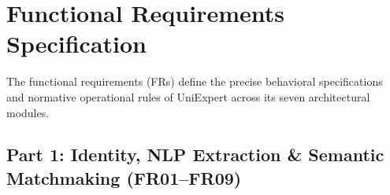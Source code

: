 \documentclass[10.5pt,a4paper]{article}
\begin{document}
\clearpage

\section{Functional Requirements Specification}

The functional requirements (FRs) define the precise behavioral specifications and normative operational rules of UniExpert across its seven architectural modules.

\subsection{Part 1: Identity, NLP Extraction \& Semantic Matchmaking (FR01--FR09)}
\end{document}
